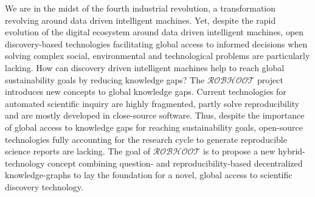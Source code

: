 \documentclass[12pt, a4paper]{article} %
\begin{document}
We are in the midst of the fourth industrial revolution, a
transformation revolving around data driven intelligent machines. Yet,
despite the rapid evolution of the digital ecosystem around data
driven intelligent machines, open discovery-based technologies
facilitating global access to informed decisions when solving complex
social, environmental and technological problems are particularly
lacking. How can discovery driven intelligent machines help to reach global
sustainability goals by reducing knowledge gaps? The
$\mathcal{ROBHOOT}$ project introduces new concepts to global
knowledge gaps. Current technologies for automated scientific inquiry
are highly fragmented, partly solve reproducibility and are mostly
developed in close-source software. Thus, despite the importance of
global access to knowledge gaps for reaching sustainability goals,
open-source technologies fully accounting for the research cycle to
generate reproducible science reports are lacking. The goal of
$\mathcal{ROBHOOT}$ is to propose a new hybrid-technology concept
combining question- and reproducibility-based decentralized
knowledge-graphs to lay the foundation for a novel, global access to
scientific discovery technology.
\end{document}
